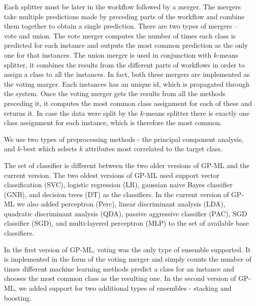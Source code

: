 \documentclass{ws-ijait}
\begin{document}
Each splitter must be later in the workflow followed by a merger. The mergers
take multiple predictions made by preceding parts of the workflow and combine
them together to obtain a single prediction. There are two types of mergers --
vote and union. The vote merger computes the number of times each class is
predicted for each instance and outputs the most common prediction as the only
one for that instances. The union merger is used in conjunction with $k$-means
splitter, it combines the results from the different parts of workflows in order
to assign a class to all the instances. In fact, both these mergers are
implemented as the voting marger. Each instances has an unique id, which is
propagated through the system. Once the voting merger gets the results from all 
the methods preceding it, it computes the most common class assignment for each
of these and returns it. In case the data were split by the $k$-means splitter
there is exactly one class assignment for each instance, which is therefore the 
most common.

We use two types of preprocessing methods - the principal component analysis,
and $k$-best which selects $k$ attributes most correlated to the target class.

The set of classifier is different between the two older versions of GP-ML and
the current version. The two oldest versions of GP-ML used support vector
classification (SVC), logistic regression (LR), gaussian naive Bayes classifier
(GNB), and decision trees (DT) as the classifiers. In the current version of
GP-ML we also added perceptron (Perc), linear discriminant analysis (LDA),
quadratic discriminant analysis (QDA), passive aggressive classifier (PAC), SGD
classifier (SGD), and multi-layered perceptron (MLP) to the set of available
base classifiers. 

In the first version of GP-ML, voting was the only type of ensemble supported.
It is implemented in the form of the voting merger and simply counts the number
of times different machine learning methods predict a class for an instance and
chooses the most common class as the resulting one. In the second version of
GP-ML, we added support for two additional types of ensembles - stacking and
boosting.
\end{document}
